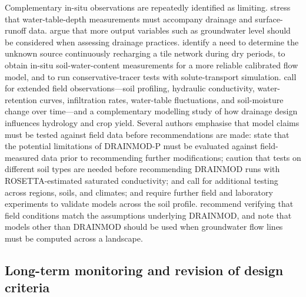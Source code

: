Complementary in-situ observations are repeatedly identified as limiting.
\textcite{Askar2020} stress that water-table-depth measurements must accompany
drainage and surface-runoff data. \textcite{Salo2017} argue that more output
variables such as groundwater level should be considered when assessing
drainage practices. \textcite{Varvaris2018} identify a need to determine the
unknown source continuously recharging a tile network during dry periods, to
obtain in-situ soil-water-content measurements for a more reliable calibrated
flow model, and to run conservative-tracer tests with solute-transport
simulation. \textcite{Hwang2024} call for extended field observations---soil
profiling, hydraulic conductivity, water-retention curves, infiltration rates,
water-table fluctuations, and soil-moisture change over time---and a
complementary modelling study of how drainage design influences hydrology and
crop yield. Several authors emphasise that model claims must be tested against
field data before recommendations are made: \textcite{Askar2021} state that
the potential limitations of DRAINMOD-P must be evaluated against
field-measured data prior to recommending further modifications;
\textcite{Salazar2008} caution that tests on different soil types are needed
before recommending DRAINMOD runs with ROSETTA-estimated saturated
conductivity; \textcite{Singh2020b} and \textcite{Malota2024} call for
additional testing across regions, soils, and climates; and
\textcite{Holbak2021} require further field and laboratory experiments to
validate models across the soil profile. \textcite{Sinai2006} recommend
verifying that field conditions match the assumptions underlying DRAINMOD, and
\textcite{He2002} note that models other than DRAINMOD should be used when
groundwater flow lines must be computed across a landscape.

\subsection{Long-term monitoring and revision of design criteria}

